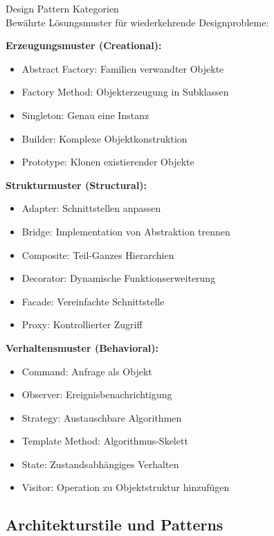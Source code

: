 \begin{concept}{Design Pattern Kategorien}\\
Bewährte Lösungsmuster für wiederkehrende Designprobleme:

\textbf{Erzeugungsmuster (Creational):}
\begin{itemize}
    \item Abstract Factory: Familien verwandter Objekte
    \item Factory Method: Objekterzeugung in Subklassen
    \item Singleton: Genau eine Instanz
    \item Builder: Komplexe Objektkonstruktion
    \item Prototype: Klonen existierender Objekte
\end{itemize}

\textbf{Strukturmuster (Structural):}
\begin{itemize}
    \item Adapter: Schnittstellen anpassen
    \item Bridge: Implementation von Abstraktion trennen
    \item Composite: Teil-Ganzes Hierarchien
    \item Decorator: Dynamische Funktionserweiterung
    \item Facade: Vereinfachte Schnittstelle
    \item Proxy: Kontrollierter Zugriff
\end{itemize}

\textbf{Verhaltensmuster (Behavioral):}
\begin{itemize}
    \item Command: Anfrage als Objekt
    \item Observer: Ereignisbenachrichtigung
    \item Strategy: Austauschbare Algorithmen
    \item Template Method: Algorithmus-Skelett
    \item State: Zustandsabhängiges Verhalten
    \item Visitor: Operation zu Objektstruktur hinzufügen
\end{itemize}
\end{concept}

\subsection{Architekturstile und Patterns}

